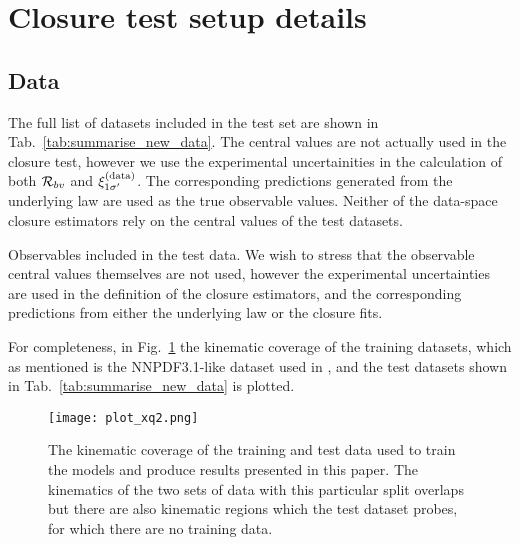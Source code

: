 \section{Closure test setup details}
\label{sec:appendix-datasets}

\subsection{Data}

The full list of datasets included in the test set are shown in
Tab.~\ref{tab:summarise_new_data}. The central values are not actually used
in the closure test, however we use the experimental uncertainities in
the calculation of both $\mathcal{R}_{bv}$ and $\xi^{(\rm data)}_{1 {{\sigma}^{\prime}}}$. The corresponding
predictions generated from the underlying law are used as the true
observable values. Neither of the data-space closure estimators rely on
the central values of the test datasets.

\begin{table}[h!]
    \begin{center}
        
    \end{center}
    \caption{
        Observables included in the test data. We wish to stress that the observable
        central values themselves are not used, however the experimental
        uncertainties are used in the definition of the closure estimators, and
        the corresponding predictions from either the underlying law or the
        closure fits.
    }
    \label{tab:summarise_new_data}
\end{table}

For completeness, in Fig.~\ref{fig:DataKinematicCoverage}
the kinematic coverage of the training datasets, which
as mentioned is the NNPDF3.1-like dataset used in \cite{Faura_2020}, and the
test datasets shown in Tab.~\ref{tab:summarise_new_data} is plotted.

\begin{figure}
    \centering
    \texttt{[image: plot\_xq2.png]}
    \caption{The kinematic coverage of the training and test data
    used to train the models and produce results presented in this paper. 
    The kinematics of the two
    sets of data with this particular split overlaps but there are also kinematic
    regions which the test dataset probes, for which there are no training data.}
    \label{fig:DataKinematicCoverage}
\end{figure}

